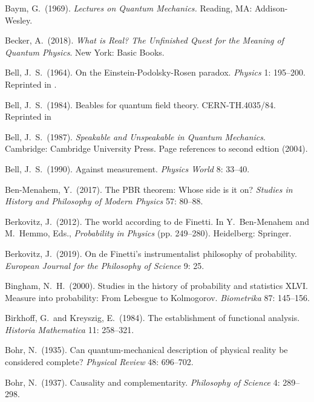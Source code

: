 \documentclass[12pt]{article}
\numberwithin{equation}{section}
\begin{document}
\begin{thebibliography}{}
 Baym, G.\ (1969). \emph{Lectures on Quantum Mechanics.} Reading, MA: Addison-Wesley.

 Becker, A.\ (2018). \emph{What is Real? The Unfinished Quest for the Meaning of Quantum Physics}. New York: Basic Books.

 Bell, J.\ S.\ (1964). On the Einstein-Podolsky-Rosen paradox. \emph{Physics} 1: 195--200. Reprinted in \citet[pp.\ 14--21]{Bell 1987}.

 Bell, J.\ S.\ (1984). Beables for quantum field theory. CERN-TH.4035/84. Reprinted in \citet[pp.\ 159--166]{Bell 1987}

 Bell, J.\ S.\ (1987). \emph{Speakable and Unspeakable in Quantum Mechanics}. Cambridge: Cambridge University Press. Page references to second edtion (2004).

 Bell, J.\ S.\ (1990). Against measurement. \emph{Physics World} 8: 33--40.

 Ben-Menahem, Y.\ (2017). The PBR theorem: Whose side is it on? \emph{Studies in History and Philosophy of Modern Physics} 57: 80--88.

 Berkovitz, J.\ (2012). The world according to de {F}inetti. In Y.\ Ben-Menahem and M.\ Hemmo, Eds., \emph{Probability in Physics} (pp. 249--280). Heidelberg: Springer.

 Berkovitz, J.\ (2019). On de {F}inetti's instrumentalist philosophy of probability. \emph{European Journal for the Philosophy of Science} 9: 25.

 Bingham, N.\ H.\ (2000). Studies in the history of probability and statistics XLVI. Measure into probability: From Lebesgue to Kolmogorov. \emph{Biometrika} 87: 145--156.

 Birkhoff, G.\ and Kreyszig, E.\ (1984). The establishment of functional analysis. \emph{Historia Mathematica} 11: 258--321.

 Bohr, N.\ (1935). Can quantum-mechanical description of physical reality be considered complete? \emph{Physical Review} 48: 696--702.

 Bohr, N.\ (1937). Causality and complementarity. \emph{Philosophy of Science} 4: 289--298.


\end{thebibliography}
\end{document}
